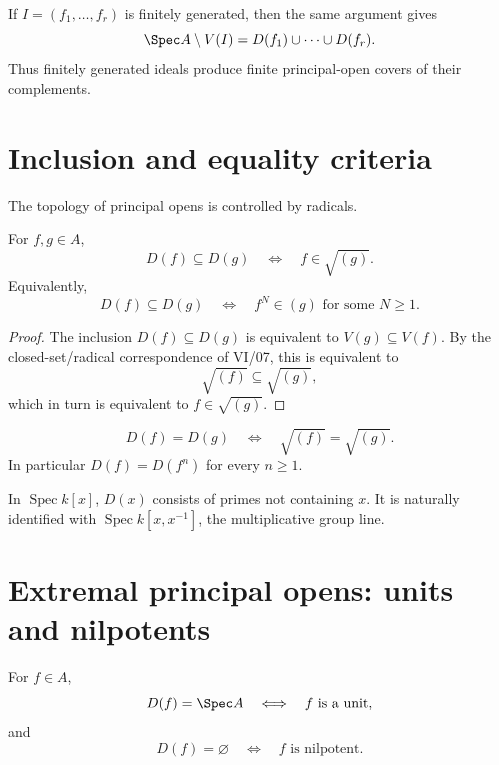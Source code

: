 If $I=(f_1,\dots,f_r)$ is finitely generated, then the same argument gives
\[
\Spec A\setminus V(I)=D(f_1)\cup\cdots\cup D(f_r).
\]
Thus finitely generated ideals produce finite principal-open covers of their complements.

\section{Inclusion and equality criteria}

The topology of principal opens is controlled by radicals.

\begin{theorem}
For $f,g\in A$,
\[
D(f)\subseteq D(g)
\quad\Longleftrightarrow\quad
f\in\sqrt{(g)}.
\]
Equivalently,
\[
D(f)\subseteq D(g)
\quad\Longleftrightarrow\quad
f^N\in(g)\text{ for some }N\ge1.
\]
\end{theorem}

\begin{proof}
The inclusion $D(f)\subseteq D(g)$ is equivalent to $V(g)\subseteq V(f)$.  By the
closed-set/radical correspondence of VI/07, this is equivalent to
\[
\sqrt{(f)}\subseteq\sqrt{(g)},
\]
which in turn is equivalent to $f\in\sqrt{(g)}$.
\end{proof}

\begin{corollary}
\[
D(f)=D(g)
\quad\Longleftrightarrow\quad
\sqrt{(f)}=\sqrt{(g)}.
\]
In particular $D(f)=D(f^n)$ for every $n\ge1$.
\end{corollary}



\begin{example}\label{ex:vi08-expand-01}
In $\operatorname{Spec}k[x]$, $D(x)$ consists of primes not containing $x$.  It is naturally identified with $\operatorname{Spec}k[x,x^{-1}]$, the multiplicative group line.
\end{example}
\section{Extremal principal opens: units and nilpotents}

\begin{proposition}
For $f\in A$,
\[
D(f)=\Spec A\quad\Longleftrightarrow\quad f\text{ is a unit},
\]
and
\[
D(f)=\varnothing\quad\Longleftrightarrow\quad f\text{ is nilpotent}.
\]
\end{proposition}

